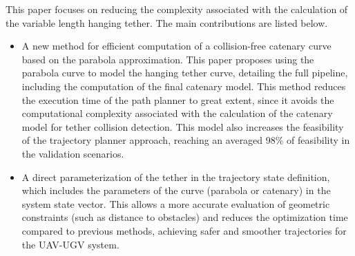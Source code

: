 This paper focuses on reducing the complexity associated with the calculation of the variable length hanging tether. %
The main contributions are listed below.

\begin{itemize}
    \item A new method for efficient computation of a collision-free catenary curve based on the parabola approximation. This paper proposes using the parabola curve to model the hanging tether curve, detailing the full pipeline, including the computation of the final catenary model. This method reduces the execution time of the path planner to great extent, since it avoids the computational complexity associated with the calculation of the catenary model for tether collision detection. This model also increases the feasibility of the trajectory planner approach, reaching an averaged 98\% of feasibility in the validation scenarios. 

    \item A direct parameterization of the tether in the trajectory state definition, which includes the parameters of the curve (parabola or catenary) in the system state vector. This allows a more accurate evaluation of geometric constraints (such as distance to obstacles) and reduces the optimization time  compared to previous methods, achieving safer and smoother trajectories for the UAV-UGV system. 
\end{itemize}




